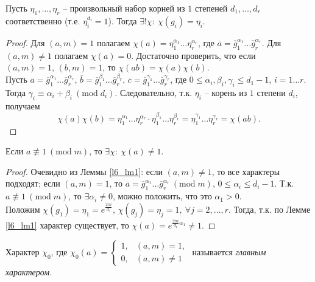 \begin{lemma} \label{l6_lm1}
	Пусть $\eta_1, \dots, \eta_r$ -- произвольный набор корней из $1$ степеней $d_1, \dots, d_r$ соответственно (т.е. $\eta_i^{d_i} = 1$). 
	Тогда $\exists! \chi: \ \chi(g_i) = \eta_i$. 
\end{lemma}
\begin{proof}
	Для $(a,m)=1$ полагаем $\chi(a) = \eta_1^{\alpha_1} \dots \eta_r^{\alpha_r}$, где $\overline{a} = \overline{g}_1^{\alpha_1} \dots \overline{g}_r^{\alpha_r}$. Для $(a,m) \ne 1$ полагаем $\chi(a) = 0$. Достаточно проверить, что если 
	$(a,m)=1, \, (b,m)=1$, то $\chi(ab) = \chi(a)\chi(b)$.\\
	Пусть $\overline{a} = \overline{g}_1^{\alpha_1} \dots \overline{g}_r^{\alpha_r}, \, \overline{b} = \overline{g}_1^{\beta_1} \dots \overline{g}_r^{\beta_r}, \, \overline{c} = \overline{g}_1^{\gamma_1} \dots \overline{g}_r^{\gamma_r}$, где $0 \leq \alpha_i, \beta_i, \gamma_i \leq d_1 - 1, \, i=1 \dots r$. 
	Тогда $\gamma_i \equiv \alpha_i + \beta_i \ (\mathrm{mod} \; d_i)$. Следовательно, т.к. $\eta_i$ -- корень из $1$ степени $d_i$, получаем
	$$\chi(a)\chi(b) = \eta_1^{\alpha_1} \dots \eta_r^{\alpha_r} \cdot \eta_1^{\beta_1} \dots \eta_r^{\beta_r} = \eta_1^{\gamma_1} \dots \eta_r^{\gamma_r} = \chi(ab).$$
\end{proof}

\begin{lemma} \label{l6_lm2}
	Если $a \not \equiv 1 \ (\mathrm{mod} \; m)$, то $\exists \chi: \ \chi(a) \ne 1$.
\end{lemma}
\begin{proof}
	Очевидно из Леммы \ref{l6_lm1}: если $(a,m) \ne 1$, то все характеры подходят; если $(a,m) = 1$, то $\overline{a}=\overline{g}_1^{\alpha_1} \dots \overline{g}_r^{\alpha_r} \ (\mathrm{mod} \; m), \, 0 \leq \alpha_i \leq d_i-1$. Т.к. $a \not\equiv 1 \ (\mathrm{mod} \; m)$, то $\exists \alpha_i \ne 0$, можно положить, что это $\alpha_1 > 0$.\\
	Положим $\chi\left( g_1 \right) = \eta_1 = e^{\frac{2\pi i}{d_1}}, \, \chi\left( g_j \right) = \eta_j = 1, \ \forall j = 2, \dots, r$. 		Тогда, т.к. по Лемме \ref{l6_lm1} характер существует, то $\chi(a) = e^{\frac{2\pi i}{d_1}\alpha_1} \ne 1$.
\end{proof}

\begin{definition}
	Характер $\chi_0$, где $\chi_0(a) = \begin{cases} 
		1, & (a,m)=1, \\ 
		0, & (a,m) \ne 1 
	\end{cases}$ называется \textit{главным характером}.
\end{definition}

